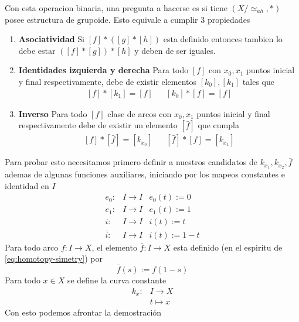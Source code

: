 Con esta operacion binaria, una pregunta a hacerse es si tiene
\((X/\simeq_{ah} , *)\) posee
estructura de grupoide. Esto equivale a cumplir 3 propiedades
\begin{enumerate}
\item \textbf{Asociatividad} Si \([f] * ([g] * [h])\) esta definido entonces
  tambien lo debe estar \(([f] * [g]) * [h]\) y deben de ser iguales.
\item \textbf{Identidades izquierda y derecha} Para todo \([f]\) con
  \(x_0, x_1\) puntos inicial y final respectivamente, debe de
existir elementos \([k_{0}], [k_{1}]\) tales que
\[ \begin{matrix}
    [f] * [k_{1}] = [f] & & [k_{0}] * [f] = [f]
  \end{matrix}
\]
\item \textbf{Inverso} Para todo \([f]\) clase de arcos con \(x_0, x_1\)
  puntos inicial y final respectivamente debe de existir un elemento
  \([\bar{f}]\) que cumpla
\[ \begin{matrix}
    [f] * [\bar{f}] = [k_{x_0}] & & [\bar{f}] * [f] = [k_{x_1}]
  \end{matrix}
\]
\end{enumerate}
Para probar esto necesitamos primero definir a nuestros candidatos de
\(k_{x_1}, k_{x_2}, \bar{f}\) ademas de algunas funciones auxiliares,
iniciando por los mapeos constantes e identidad en \(I\)
\[ \begin{matrix}
     e_0 : & I \to I & e_0(t) := 0 \\
     e_1 : & I \to I & e_1(t) := 1 \\
     i :   & I \to I & i(t) := t \\
     \bar{i} : & I \to I & i(t) := 1 - t
   \end{matrix}
   \]
Para todo arco \(f : I \to X \), el elemento \(\bar{f} : I \to X \) esta
definido (en el espiritu de \eqref{eq:homotopy-simetry}) por
\[ \bar{f} (s) := f (1 - s) \]
Para todo \(x \in X \) se define la curva constante
\begin{align*}
  k_x : &I \to X \\
        &t \mapsto x
\end{align*}
Con esto podemos afrontar la demostración
